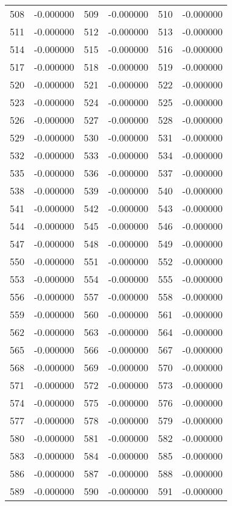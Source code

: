 \documentclass[12pt]{article}
\begin{document}
\begin{longtable}{@{}cc|cc|cc@{}}
508 & -0.000000 & 509 & -0.000000 & 510 & -0.000000 \\
511 & -0.000000 & 512 & -0.000000 & 513 & -0.000000 \\
514 & -0.000000 & 515 & -0.000000 & 516 & -0.000000 \\
517 & -0.000000 & 518 & -0.000000 & 519 & -0.000000 \\
520 & -0.000000 & 521 & -0.000000 & 522 & -0.000000 \\
523 & -0.000000 & 524 & -0.000000 & 525 & -0.000000 \\
526 & -0.000000 & 527 & -0.000000 & 528 & -0.000000 \\
529 & -0.000000 & 530 & -0.000000 & 531 & -0.000000 \\
532 & -0.000000 & 533 & -0.000000 & 534 & -0.000000 \\
535 & -0.000000 & 536 & -0.000000 & 537 & -0.000000 \\
538 & -0.000000 & 539 & -0.000000 & 540 & -0.000000 \\
541 & -0.000000 & 542 & -0.000000 & 543 & -0.000000 \\
544 & -0.000000 & 545 & -0.000000 & 546 & -0.000000 \\
547 & -0.000000 & 548 & -0.000000 & 549 & -0.000000 \\
550 & -0.000000 & 551 & -0.000000 & 552 & -0.000000 \\
553 & -0.000000 & 554 & -0.000000 & 555 & -0.000000 \\
556 & -0.000000 & 557 & -0.000000 & 558 & -0.000000 \\
559 & -0.000000 & 560 & -0.000000 & 561 & -0.000000 \\
562 & -0.000000 & 563 & -0.000000 & 564 & -0.000000 \\
565 & -0.000000 & 566 & -0.000000 & 567 & -0.000000 \\
568 & -0.000000 & 569 & -0.000000 & 570 & -0.000000 \\
571 & -0.000000 & 572 & -0.000000 & 573 & -0.000000 \\
574 & -0.000000 & 575 & -0.000000 & 576 & -0.000000 \\
577 & -0.000000 & 578 & -0.000000 & 579 & -0.000000 \\
580 & -0.000000 & 581 & -0.000000 & 582 & -0.000000 \\
583 & -0.000000 & 584 & -0.000000 & 585 & -0.000000 \\
586 & -0.000000 & 587 & -0.000000 & 588 & -0.000000 \\
589 & -0.000000 & 590 & -0.000000 & 591 & -0.000000 \\

\end{longtable}
\end{document}
